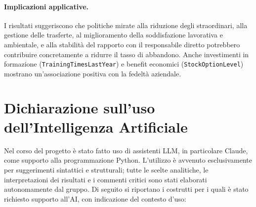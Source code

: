 \documentclass{article}
\begin{document}
\paragraph{Implicazioni applicative.}
I risultati suggeriscono che politiche mirate alla riduzione degli straordinari, alla gestione delle trasferte, al miglioramento della soddisfazione lavorativa e ambientale, e alla stabilità del rapporto con il responsabile diretto potrebbero contribuire concretamente a ridurre il tasso di abbandono. Anche investimenti in formazione (\texttt{TrainingTimesLastYear}) e benefit economici (\texttt{StockOptionLevel}) mostrano un'associazione positiva con la fedeltà aziendale.
 
\section*{Dichiarazione sull'uso dell'Intelligenza Artificiale}
Nel corso del progetto è stato fatto uso di assistenti LLM, in particolare Claude, come supporto alla programmazione Python. L'utilizzo è avvenuto esclusivamente per suggerimenti
sintattici e strutturali; tutte le scelte analitiche, le interpretazioni dei risultati e i commenti critici sono stati elaborati autonomamente dal gruppo.
Di seguito si riportano i costrutti per i quali è stato richiesto supporto all'AI, con indicazione del contesto d'uso:
 
\end{document}
